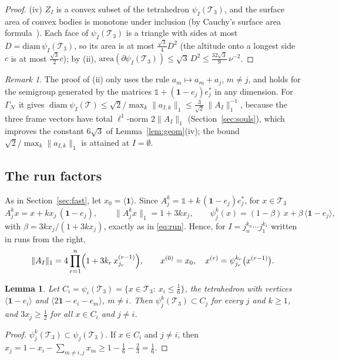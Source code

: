 \documentclass[11pt]{amsart}
\newcommand{\id}{\mathds{1}}
\newtheorem{lemma}[proposition]{Lemma}
\theoremstyle{definition}
\theoremstyle{remark}
\newtheorem{remark}[proposition]{Remark}
\newcommand{\one}{\mathbf 1}
\newcommand{\cT}{\mathcal T}
\newcommand{\GN}{\Gamma_{\mathcal N}}
\newcommand{\norm}[1]{\lVert #1\rVert}
\newcommand{\pr}[1]{\langle #1\rangle}
\begin{document}
\begin{proof}
(iv) $\overline{Z_I}$ is a convex subset of the tetrahedron $\psi_I(\cT_3)$, and the surface area of convex bodies is monotone under inclusion (by Cauchy's surface area formula~\cite[(5.73)]{Sch14}). Each face of $\psi_I(\cT_3)$ is a triangle with sides at most $D=\mathrm{diam}\,\psi_I(\cT_3)$, so its area is at most $\frac{\sqrt3}4D^2$ (the altitude onto a longest side $c$ is at most $\frac{\sqrt3}2c$); by (ii), $\mathrm{area}(\partial\psi_I(\cT_3))\le\sqrt3\,D^2\le\frac{32\sqrt3}9\,\nu^{-2}$.
\end{proof}

\begin{remark}
The proof of (ii) only uses the rule $a_m\mapsto a_m+a_j$, $m\neq j$, and holds for the semigroup generated by the matrices $\id+(\one-e_j)e_j^*$ in any dimension.
For $\GN$ it gives $\operatorname{diam}\psi_I(\cT)\le\sqrt2/\max_k\norm{a_{I,k}}_1
\le\frac3{\sqrt2}\,\norm{A_I}_1^{-1}$, because the three frame vectors have total $\ell^1$-norm $2\norm{A_I}_1$ (Section~\ref{sec:souls}), which improves the constant $6\sqrt3$ of
Lemma~\ref{lem:geom}(iv); the bound $\sqrt2/\max_k\norm{a_{I,k}}_1$ is attained at $I=\emptyset$.
\end{remark}

\subsection*{The run factors}
As in Section~\ref{sec:fast}, let $x_0=\pr{\one}$. Since $A_j^k=\id+k\,(\one-e_j)e_j^*$, for $x\in \cT_3$
\[
  A_j^kx=x+kx_j\,(\one-e_j),\qquad\norm{A_j^kx}_1=1+3kx_j,\qquad
  \psi_j^k(x)=(1-\beta)\,x+\beta\,\pr{\one-e_j},
\]
with $\beta=3kx_j/(1+3kx_j)$, exactly as in \eqref{eq:run}. Hence, for $I=j_n^{k_n}\cdots j_1^{k_1}$ written in runs from the right,
\begin{equation}\label{eq:cocycle3}
  \|A_I\|_1=4\prod_{r=1}^n\Bigl(1+3k_r\,x^{(r-1)}_{j_r}\Bigr),\qquad
  x^{(0)}=x_0,\quad x^{(r)}=\psi_{j_r}^{k_r}\bigl(x^{(r-1)}\bigr).
\end{equation}

\begin{lemma}\label{lem:trap3}
Let $C_i=\psi_i(\cT_3)=\{x\in \cT_3:\ x_i\le\frac16\}$, the tetrahedron with vertices $\pr{\one-e_i}$ and $\pr{2\one-e_i-e_m}$, $m\neq i$. Then $\psi_j^k(\cT_3)\subset C_j$ for every $j$ and $k\ge1$, and $3x_j\ge\frac12$ for all $x\in C_i$ and $j\neq i$.
\end{lemma}

\begin{proof}
$\psi_j^k(\cT_3)\subset\psi_j(\cT_3)$. If $x\in C_i$ and $j\neq i$, then
$x_j=1-x_i-\sum_{m\ne i,j}x_m\ge1-\frac16-\frac23=\frac16$.
\end{proof}
\end{document}
